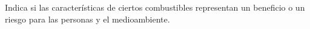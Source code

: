Indica si las características de ciertos combustibles representan un beneficio
o un riesgo para las personas y el medioambiente.
\begin{parts}
    
    
    
    
    
    
\end{parts}